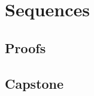\chapter{Sequences}
\label{chap:sequences}

\LRAExcludeFromPrintEditionBegin
\section*{Proofs}

\section*{Capstone}

\LRAExcludeFromPrintEditionEnd
